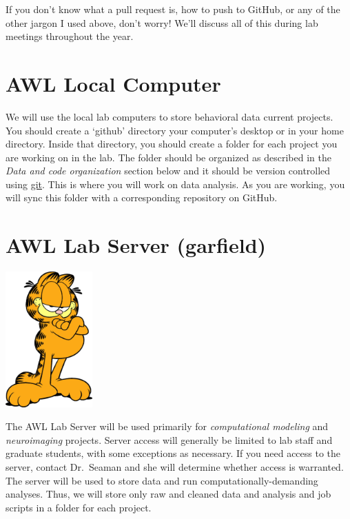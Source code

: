 \documentclass[]{book}
\begin{document}
If you don't know what a pull request is, how to push to GitHub, or any of the other jargon I used above, don't worry! We'll discuss all of this during lab meetings throughout the year.

\hypertarget{awl-local-computer}{%
\section{AWL Local Computer}\label{awl-local-computer}}

We will use the local lab computers to store behavioral data current projects. You should create a `github' directory your computer's desktop or in your home directory. Inside that directory, you should create a folder for each project you are working on in the lab. The folder should be organized as described in the \emph{Data and code organization} section below and it should be version controlled using \href{https://git-scm.com/}{git}. This is where you will work on data analysis. As you are working, you will sync this folder with a corresponding repository on GitHub.

\hypertarget{awl-lab-server-garfield}{%
\section{AWL Lab Server (garfield)}\label{awl-lab-server-garfield}}

\includegraphics[width=0.25\textwidth,height=\textheight]{images/garfield.jpeg}

The AWL Lab Server will be used primarily for \emph{computational modeling} and \emph{neuroimaging} projects. Server access will generally be limited to lab staff and graduate students, with some exceptions as necessary. If you need access to the server, contact Dr.~Seaman and she will determine whether access is warranted. The server will be used to store data and run computationally-demanding analyses. Thus, we will store only raw and cleaned data and analysis and job scripts in a folder for each project.
\end{document}
